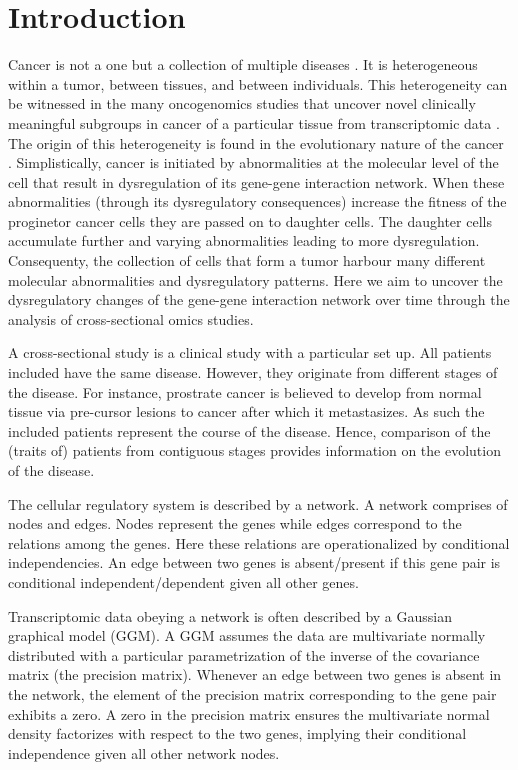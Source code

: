 \documentclass[10pt]{article}
\begin{document}
\section{Introduction}
Cancer is not a one but a collection of multiple diseases \citep{marte2013tumour}. It is heterogeneous within a tumor, between tissues, and between individuals. This heterogeneity can be witnessed in the many oncogenomics studies that uncover novel clinically meaningful subgroups in cancer of a particular tissue from transcriptomic data \citep{alizadeh2000,bullinger2004,lapointe2004,sorlie2001}. The origin of this heterogeneity is found in the evolutionary nature of the cancer \citep{nowell1976clonal}. Simplistically, cancer is initiated by abnormalities at the molecular level of the cell that result in dysregulation of its gene-gene interaction network. When these abnormalities (through its dysregulatory consequences) increase the fitness of the proginetor cancer cells they are passed on to daughter cells. The daughter cells accumulate further and varying abnormalities leading to more dysregulation. Consequenty, the collection of cells that form a tumor harbour many different molecular abnormalities and dysregulatory patterns. Here we aim to uncover the dysregulatory changes of the gene-gene interaction network over time through the analysis of cross-sectional omics studies.

A cross-sectional study is a clinical study with a particular set up. All patients included have the same disease. However, they originate from different stages of the disease. For instance, prostrate cancer is believed to develop from normal tissue via pre-cursor lesions to cancer after which it metastasizes\citep{mitchell2015}. As such the included patients represent the course of the disease. Hence, comparison of the (traits of) patients from contiguous stages provides information on the evolution of the disease.

The cellular regulatory system is described by a network. A network comprises of nodes and edges. Nodes represent the genes while edges correspond to the relations among the genes. Here these relations are operationalized by conditional independencies. An edge between two genes is absent/present if this gene pair is conditional independent/dependent given all other genes.

Transcriptomic data obeying a network is often described by a Gaussian graphical model (GGM). A GGM assumes the data are multivariate normally  distributed with a particular parametrization of the inverse of the covariance matrix (the precision matrix). Whenever an edge between two genes is absent in the network, the element of the precision matrix corresponding to the gene pair exhibits a zero. A zero in the precision matrix ensures the multivariate normal density factorizes with respect to the two genes, implying their conditional independence given all other network nodes.
\end{document}
